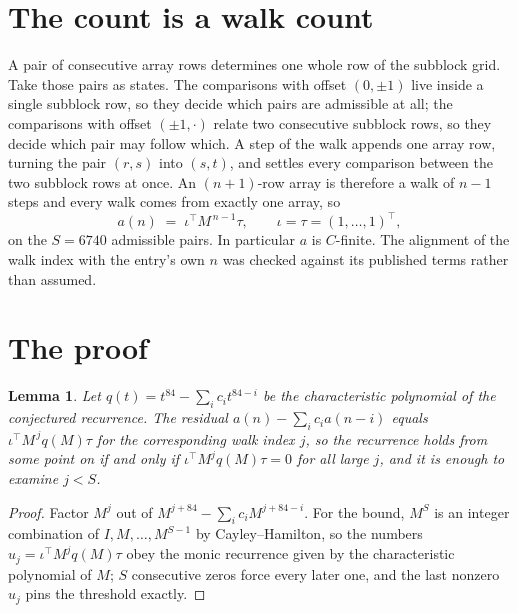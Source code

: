 \documentclass[11pt,a4paper]{article}
\theoremstyle{plain}
\newtheorem{lemma}[theorem]{Lemma}
\theoremstyle{definition}
\begin{document}
\section{The count is a walk count}

A pair of consecutive array rows determines one whole row of the subblock grid. Take those
pairs as states. The comparisons with offset $(0,\pm1)$ live inside a single subblock row, so
they decide which pairs are admissible at all; the comparisons with offset $(\pm1,\cdot)$
relate two consecutive subblock rows, so they decide which pair may follow which. A step of the
walk appends one array row, turning the pair $(r,s)$ into $(s,t)$, and settles every comparison
between the two subblock rows at once. An $(n+1)$-row array is therefore a walk of $n-1$ steps
and every walk comes from exactly one array, so
\[
a(n)\;=\;\iota^{\!\top}M^{\,n-1}\tau,\qquad \iota=\tau=(1,\dots,1)^{\!\top},
\]
on the $S=6740$ admissible pairs. In particular $a$ is $C$-finite. The alignment of the walk
index with the entry's own $n$ was checked against its published terms rather than assumed.

\section{The proof}

\begin{lemma}\label{lem:crit}
Let $q(t)=t^{84}-\sum_i c_it^{84-i}$ be the characteristic polynomial of the
conjectured recurrence. The residual $a(n)-\sum_ic_ia(n-i)$ equals
$\iota^{\!\top}M^{\,j}q(M)\tau$ for the corresponding walk index $j$, so the recurrence
holds from some point on if and only if $\iota^{\!\top}M^{j}q(M)\tau=0$ for all large $j$,
and it is enough to examine $j<S$.
\end{lemma}

\begin{proof}
Factor $M^{j}$ out of $M^{j+84}-\sum_ic_iM^{j+84-i}$. For the bound, $M^{S}$
is an integer combination of $I,M,\dots,M^{S-1}$ by Cayley--Hamilton, so the numbers
$u_j=\iota^{\!\top}M^{j}q(M)\tau$ obey the monic recurrence given by the characteristic
polynomial of $M$; $S$ consecutive zeros force every later one, and the last nonzero $u_j$
pins the threshold exactly.
\end{proof}
\end{document}
